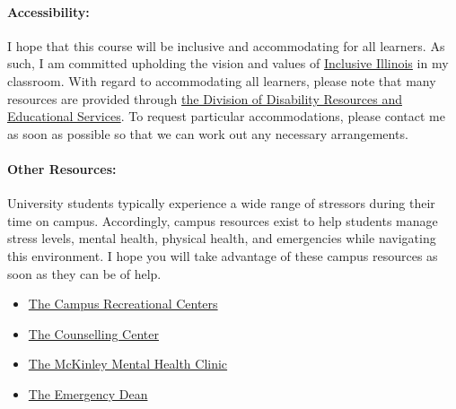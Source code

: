 \documentclass[11pt, a4paper]{article}
\begin{document}
\paragraph{Accessibility:} I hope that this course will be inclusive and 
accommodating for all learners. As such, I am committed upholding the vision 
and values of \href{http://www.inclusiveillinois.illinois.edu/index.html}{Inclusive Illinois}
in my 
classroom.  With regard to accommodating all learners, please note that many 
resources are provided through 
\href{http://disability.illinois.edu/academic-support/accommodations}{the 
Division of Disability Resources and Educational Services}.  To request 
particular accommodations, please contact me as soon as possible so that we can 
work out any necessary arrangements.

\paragraph{Other Resources:} 
University students typically experience a wide range of stressors during their 
time on campus. Accordingly, campus resources exist to help students manage  
stress levels, mental health, physical health, and emergencies while navigating 
this environment. I hope you will take advantage of these campus resources as 
soon as they can be of help.

\begin{itemize}
\item \href{https://campusrec.illinois.edu/}{The Campus Recreational Centers}
\item \href{http://counselingcenter.illinois.edu/}{The Counselling Center}
\item \href{http://www.mckinley.illinois.edu/clinics/mental\_health.htm}{The McKinley Mental Health Clinic}
\item \href{http://odos.illinois.edu/emergency/}{The Emergency Dean}
\end{itemize}
\end{document}
